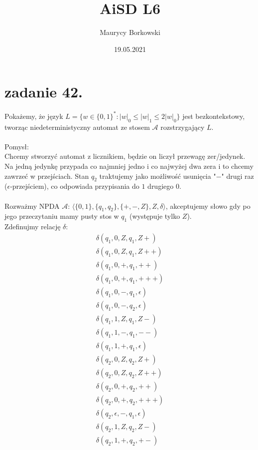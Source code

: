 \documentclass{article}
\title{AiSD L6}
\date{19.05.2021}
\author{Maurycy Borkowski}
\begin{document}
\section{zadanie 42.}
Pokażemy, że język $L = \{w \in \{0, 1\}^* : |w|_0 \leq |w|_1 \leq 2|w|_0\}$ jest bezkontekstowy, tworząc niedeterministyczny automat ze stosem $\mathcal{A}$ rozstrzygający $L$.\\\\
Pomysł:\\
Chcemy stworzyć automat z licznikiem, będzie on liczył przewagę zer/jedynek. Na jedną jedynkę przypada co najmniej jedno i co najwyżej dwa zera i to chcemy zawrzeć w przejściach. Stan $q_2$ traktujemy jako możliwość usunięcia "$-$" drugi raz ($\epsilon$-przejściem), co odpowiada przypisania do $1$ drugiego $0$.\\\\
Rozważmy NPDA $\mathcal{A}$: $\langle \{0,1\}, \{q_1, q_2\}, \{+, -, Z\}, Z, \delta \rangle$, akceptujemy słowo gdy po jego przeczytaniu mamy pusty stos w $q_1$ (występuje tylko $Z$).\\
Zdefinujmy relację $\delta$:
\begin{align}
\delta(q_1,0,Z, q_1, Z+)\\
\delta(q_1,0,Z, q_1, Z++)\\
\delta(q_1,0,+, q_1, ++)\\
\delta(q_1,0,+, q_1, +++)\\
\delta(q_1,0,-, q_1, \epsilon)\\
\delta(q_1,0,-, q_2, \epsilon)\\
\delta(q_1,1,Z, q_1, Z-)\\
\delta(q_1,1,-, q_1, --)\\
\delta(q_1,1,+, q_1, \epsilon)\\ %
\delta(q_2,0,Z, q_2, Z+)\\
\delta(q_2,0,Z, q_2, Z++)\\
\delta(q_2,0,+, q_2, ++)\\
\delta(q_2,0,+, q_2, +++)\\
\delta(q_2,\epsilon,-, q_1, \epsilon)\\
\delta(q_2,1,Z, q_2, Z-)\\
\delta(q_2,1,+, q_2, +-) %
\end{align}
\end{document}
